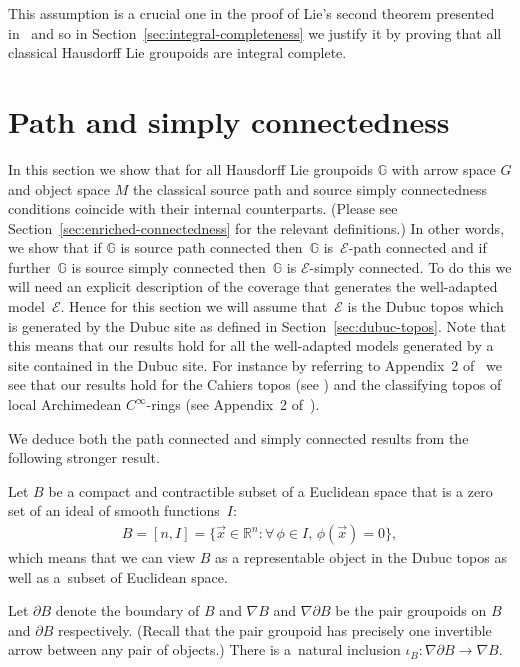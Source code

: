 \documentclass[pdftex]{sigma}
\numberwithin{equation}{section}
\begin{document}
This assumption is a crucial one in the proof of Lie's second theorem presented in~\cite{burke-relative-to-local-models} and so in Section~\ref{sec:integral-completeness} we justify it by proving that all classical Hausdorf\/f Lie groupoids are integral complete.

\section{Path and simply connectedness}\label{sec:path-and-simply-connectedness}

In this section we show that for all Hausdorf\/f Lie groupoids $\mathbb{G}$ with arrow space $G$ and object space $M$ the classical source path and source simply connectedness conditions coincide with their internal counterparts. (Please see Section~\ref{sec:enriched-connectedness} for the relevant def\/initions.) In other words, we show that if $\mathbb{G}$ is source path connected then~$\mathbb{G}$ is~$\mathcal{E}$-path connected and if further~$\mathbb{G}$ is source simply connected then~$\mathbb{G}$ is $\mathcal{E}$-simply connected. To do this we will need an explicit description of the coverage that generates the well-adapted model~$\mathcal{E}$. Hence for this section we will assume that~$\mathcal{E}$ is the Dubuc topos which is generated by the Dubuc site as def\/ined in Section~\ref{sec:dubuc-topos}. Note that this means that our results hold for all the well-adapted models generated by a site contained in the Dubuc site. For instance by referring to Appendix~2 of~\cite{MR1083355} we see that our results hold for the Cahiers topos (see \cite{MR557083}) and the classifying topos of local Archimedean $C^{\infty}$-rings (see Appendix~2 of~\cite{MR1083355}).

We deduce both the path connected and simply connected results from the following stronger result.

\begin{Notation} Let $B$ be a compact and contractible subset of a Euclidean space that is a zero set of an ideal of smooth functions~$I$:
\begin{gather*}B=[n,I]=\big\{\vec{x}\in \mathbb{R}^n\colon \forall\, \phi \in I,\, \phi(\vec{x})=0\big\},\end{gather*}
which means that we can view $B$ as a representable object in the Dubuc topos as well as a~subset of Euclidean space.

Let $\partial B$ denote the boundary of $B$ and $\nabla B$ and $\nabla\partial B$ be the pair groupoids on $B$ and $\partial B$ respectively. (Recall that the pair groupoid has precisely one invertible arrow between any pair of objects.) There is a~natural inclusion $\iota_B\colon \nabla\partial B \rightarrow \nabla B$.
\end{Notation}
\end{document}
